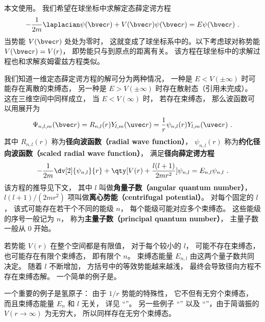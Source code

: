 

本文使用。 我们希望在球坐标中求解定态薛定谔方程
\begin{equation}\label{eq_RadSE_2}
-\frac{1}{2m}\laplacian \psi(\bvec r) + V(\bvec r)\psi(\bvec r) = E\psi(\bvec r)~.
\end{equation}
当势能 $V(\bvec r)$ 处处为零时， 这就变成了球坐标系中的。以下考虑球对称势能 $V(\bvec r) = V(r)$， 即势能只与到原点的距离有关。 该方程在球坐标中的求解过程也和求解亥姆霍兹方程类似。

我们知道一维定态薛定谔方程的解可分为两种情况， 一种是 $E < V(\pm\infty)$ 时可能存在离散的束缚态， 另一种是 $E > V(\pm\infty)$ 时存在散射态（引用未完成）。 这在三维空间中同样成立， 当 $E < V(\infty)$ 时， 若存在束缚态， 那么波函数可以用展开为
\begin{equation}\label{eq_RadSE_4}
\Psi_{n, l,m}(\bvec r) = R_{n, l}(r) Y_{l,m}(\uvec r) = \frac{1}{r}\psi_{n, l}(r) Y_{l,m}(\uvec r)~.
\end{equation}
其中 $R_{n, l}(r)$ 称为\textbf{径向波函数（radial wave function）}， $\psi_{n, l}(r)$ 称为\textbf{约化径向波函数（scaled radial wave function）}， 满足\textbf{径向薛定谔方程}
\begin{equation}\label{eq_RadSE_1}
-\frac{1}{2m} \dv[2]{\psi_{n, l}}{r} + \qty[V(r) + \frac{l(l + 1)}{2mr^2}]\psi_{n, l} = E_{n, l} \psi_{n, l}~.
\end{equation}
该方程的推导见下文， 其中 $l$ 叫做\textbf{角量子数（angular quantum number）}， $l(l + 1)/(2mr^2)$ 项叫做\textbf{离心势能（centrifugal potential）}。 对每个固定的 $l$， 该式可能存在若干个不同的能级 $n$， 每个能级可能对应多个束缚态。 这些能级的序号一般记为 $n$， 称为\textbf{主量子数（principal quantum number）}， 主量子数一般从 0 开始。

若势能 $V(r)$ 在整个空间都是有限值， 对于每个较小的 $l$， 可能不存在束缚态， 也可能存在有限个束缚态， 即有限个 $n$。 束缚态能量 $E_{n,l}$ 由这两个量子数共同决定。 随着 $l$ 不断增加， 方括号中的等效势能越来越浅， 最终会导致径向方程不存在束缚态解。 一个简单的例子是。

一个重要的例子是氢原子： 由于 $1/r$ 势能的特殊性， 它不但有无穷个束缚态， 而且束缚态能量 $E_n$ 和 $l$ 无关， 详见 “”。 另一些例子 “” 以及 “”，由于简谐振的 $V(r\to \infty)$ 为无穷大， 所以同样存在无穷个束缚态。

